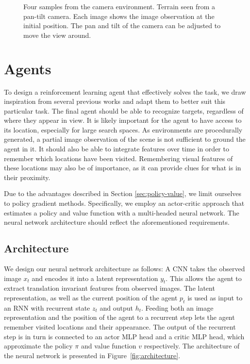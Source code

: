 \begin{figure}
    \centering
    
    \caption[Camera environment]{Four samples from the camera environment. Terrain seen from a pan-tilt camera. Each image shows the image observation at the initial position. The pan and tilt of the camera can be adjusted to move the view around.}
    \label{fig:camera}
\end{figure}

\section{Agents}
\label{sec:agents}

To design a reinforcement learning agent that effectively solves the task, we draw inspiration from several previous works and adapt them to better suit this particular task.
The final agent should be able to recognize targets, regardless of where they appear in view.
It is likely important for the agent to have access to its location, especially for large search spaces.
As environments are procedurally generated, a partial image observation of the scene is not sufficient to ground the agent in it.
It should also be able to integrate features over time in order to remember which locations have been visited.
Remembering visual features of these locations may also be of importance, as it can provide clues for what is in their proximity.

Due to the advantages described in Section \ref{sec:policy-value}, we limit ourselves to policy gradient methods.
Specifically, we employ an actor-critic approach that estimates a policy and value function with a multi-headed neural network.
The neural network architecture should reflect the aforementioned requirements.

\subsection{Architecture}

We design our neural network architecture as follows:
A CNN takes the observed image \(x_t\) and encodes it into a latent representation \(y_t\).
This allows the agent to extract translation invariant features from observed images.
The latent representation, as well as the current position of the agent \(p_t\) is used as input to an RNN with recurrent state \(z_t\) and output \(h_t\).
Feeding both an image representation and the position of the agent to a recurrent step lets the agent remember visited locations and their appearance.
The output of the recurrent step is in turn is connected to an actor MLP head and a critic MLP head, which approximate the policy \(\pi\) and value function \(v\) respectively.
The architecture of the neural network is presented in Figure~\ref{fig:architecture}.

